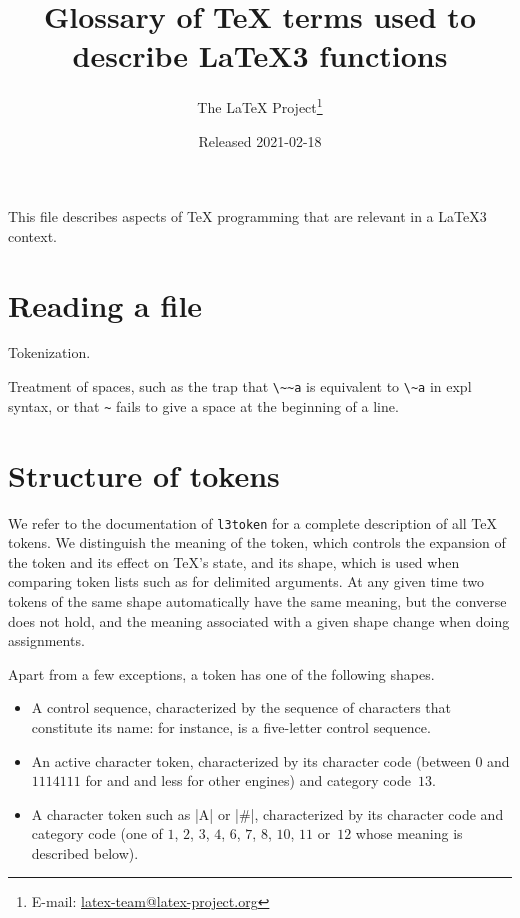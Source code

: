 \documentclass{l3doc}
\title{%
  Glossary of \TeX{} terms used to describe \LaTeX3 functions%
}
\author{%
  The \LaTeX{} Project\thanks
    {%
      E-mail:
      \href{mailto:latex-team@latex-project.org}%
        {latex-team@latex-project.org}%
    }%
}
\date{Released 2021-02-18}
\begin{document}
\maketitle

This file describes aspects of \TeX{} programming that are relevant in a
\LaTeX3 context.

\section{Reading a file}

Tokenization.

Treatment of spaces, such as the trap that \verb|\~~a| is equivalent to
\verb|\~a| in expl syntax, or that \verb|~| fails to give a space at the
beginning of a line.

\section{Structure of tokens}

We refer to the documentation of \texttt{l3token} for a complete
description of all \TeX{} tokens.  We distinguish the meaning of the
token, which controls the expansion of the token and its effect on
\TeX{}'s state, and its shape, which is used when comparing token lists
such as for delimited arguments.  At any given time two tokens of the
same shape automatically have the same meaning, but the converse does
not hold, and the meaning associated with a given shape change when
doing assignments.

Apart from a few exceptions, a token has one of the following shapes.
\begin{itemize}
  \item A control sequence, characterized by the sequence of characters
    that constitute its name: for instance,  is a five-letter
    control sequence.
  \item An active character token, characterized by its character code
    (between $0$ and $1114111$ for \LuaTeX{} and \XeTeX{} and less for
    other engines) and category code~$13$.
  \item A character token such as |A| or |#|, characterized by its
    character code and category code (one of $1$, $2$, $3$, $4$, $6$,
    $7$, $8$, $10$, $11$ or~$12$ whose meaning is described below).
\end{itemize}
\end{document}
